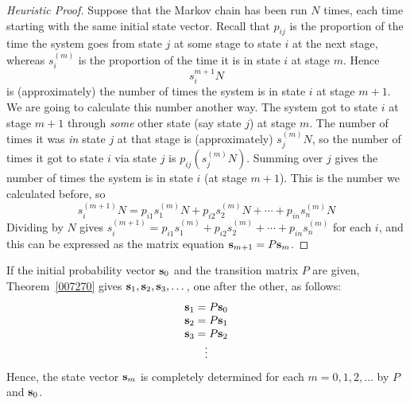 \documentclass{ximera}
\begin{document}
\begin{proof}[Heuristic Proof]
Suppose that the Markov chain has been run $N$ times, each time starting with the same initial state vector. Recall that $p_{ij}$ is the proportion of the time the system goes from state $j$ at some stage to state $i$ at the next stage, whereas $s_{i}^{(m)}$ is the proportion of the time it is in state $i$ at stage $m$. Hence
\begin{equation*}
s_{i}^{m+1}N
\end{equation*}
is (approximately) the number of times the system is in state $i$ at stage $m + 1$. We are going to calculate this number another way. The system got to state $i$ at stage $m + 1$ through \textit{some} other state (say state $j$) at stage $m$. The number of times it was \textit{in} state $j$ at that stage is (approximately) $s_{j}^{(m)}N$, so the number of times it got to state $i$ via state $j$ is $p_{ij}(s_{j}^{(m)}N)$. Summing over $j$ gives the number of times the system is in state $i$ (at stage $m + 1$). This is the number we calculated before, so
\begin{equation*}
s_{i}^{(m+1)}N = p_{i1}s_{1}^{(m)}N + p_{i2}s_{2}^{(m)}N + \cdots + p_{in}s_{n}^{(m)}N
\end{equation*}
Dividing by $N$ gives $s_{i}^{(m+1)} = p_{i1}s_{1}^{(m)} + p_{i2}s_{2}^{(m)} + \cdots + p_{in}s_{n}^{(m)}$ for each $i$, and this can be expressed as the matrix equation ${\bf s}_{m+1} = P{\bf s}_{m}$.
\end{proof}

If the initial probability vector ${\bf s}_{0}$ and the transition matrix $P$ are given, Theorem~\ref{007270} gives ${\bf s}_{1}, {\bf s}_{2}, {\bf s}_{3}, \dots$, one after the other, as follows:
\begin{equation*}
\begin{array}{c}
{\bf s}_{1} = P{\bf s}_0 \\
{\bf s}_{2} = P{\bf s}_1 \\
{\bf s}_{3} = P{\bf s}_2 \\
\vdots
\end{array}
\end{equation*}
Hence, the state vector ${\bf s}_{m}$ is completely determined for each $m = 0, 1, 2, \dots$ by $P$ and ${\bf s}_{0}$.
\end{document}
